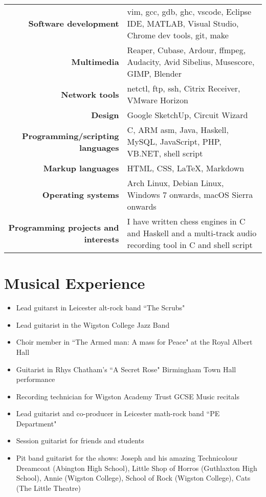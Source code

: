 \documentclass{article}
\begin{document}
{\renewcommand{\arraystretch}{1.4}

\begin{tabular}{ r | p{8cm} }

{\large\bfseries Software development} & {vim, gcc, gdb, ghc, vscode, Eclipse IDE, MATLAB, Visual Studio, Chrome dev tools, git, make}\\
{\large\bfseries Multimedia} & {Reaper, Cubase, Ardour, ffmpeg, Audacity, Avid Sibelius, Musescore, GIMP, Blender} \\
{\large\bfseries Network tools} & {netctl, ftp, ssh, Citrix Receiver, VMware Horizon} \\
{\large\bfseries Design} & {Google SketchUp, Circuit Wizard} \\
{\large\bfseries Programming/scripting languages} & {C, ARM asm, Java, Haskell, MySQL, JavaScript, PHP, VB.NET, shell script}\\
{\large\bfseries Markup languages} & {HTML, CSS, \LaTeX, Markdown}\\
{\large\bfseries Operating systems} & {Arch Linux, Debian Linux, Windows 7 onwards, macOS Sierra onwards}\\
{\large\bfseries Programming projects and interests} & {I have written chess engines in C and Haskell and a multi-track audio recording tool in C and shell script}\\
\end{tabular}

\section{Musical Experience}
\begin{itemize}[noitemsep]

\item Lead guitarst in Leicester alt-rock band ``The Scrubs"
\item Lead guitarist in the Wigston College Jazz Band
\item Choir member in ``The Armed man: A mass for Peace" at the Royal Albert Hall
\item Guitarist in Rhys Chatham's ``A Secret Rose" Birmingham Town Hall performance
\item Recording technician for Wigston Academy Trust GCSE Music recitals
\item Lead guitarist and co-producer in Leicester math-rock band ``PE Department"
\item Session guitarist for friends and students
\item Pit band guitarist for the shows: Joseph and his amazing Technicolour Dreamcoat (Abington High School),
Little Shop of Horros (Guthlaxton High School), Annie (Wigston College), School of Rock (Wigston College), Cats (The Little Theatre)


\end{itemize}}
\end{document}
